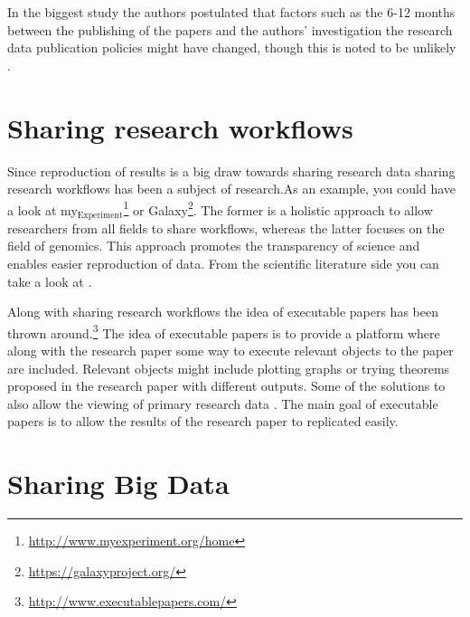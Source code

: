 In the biggest study the authors postulated that factors such as the 6-12
months between the publishing of the papers and the authors' investigation
the research data publication policies might have changed, though this is noted
to be unlikely \cite{alsheikh2011public}.

\section{Sharing research workflows}

Since reproduction of results is a big draw towards sharing research data
sharing research workflows has been a subject of research.As an example, you
could have a look at my\({}_{\mbox{Experiment}}\)\footnote{\url{http://www.myexperiment.org/home}}
or Galaxy\footnote{\url{https://galaxyproject.org/}}.
The former is a holistic approach to allow researchers from all
fields to share workflows, whereas the latter focuses on the field of genomics.
This approach promotes the transparency of science and enables
easier reproduction of data. From the scientific literature side you can take
a look at \cite{goecks2010galaxy, DBLP:journals/fgcs/RoureGS09}.

Along with sharing research workflows the idea of executable papers has been
thrown around.\footnote{\url{http://www.executablepapers.com/}} The idea of
executable papers is to provide a platform where along with the research paper
some way to execute relevant objects to the paper are included. Relevant
objects might include plotting graphs or trying theorems proposed in the
research paper with different outputs. Some of the solutions to also allow
the viewing of primary research data
\cite{DBLP:journals/procedia/GorpM11, DBLP:journals/procedia/NowakowskiCHKKBMDM11}.
The main goal of executable papers is to allow the results of the research
paper to replicated easily.

\section{Sharing Big Data}

